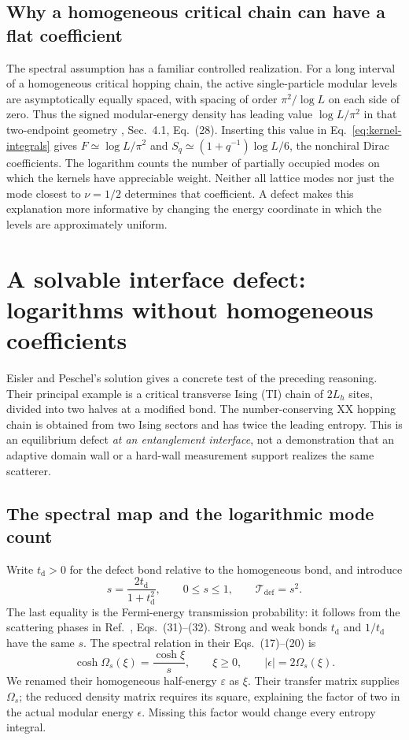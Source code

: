 \documentclass[aps,prb,onecolumn,nofootinbib,superscriptaddress]{revtex4-2}
\begin{document}
\subsection{Why a homogeneous critical chain can have a flat coefficient}
The spectral assumption has a familiar controlled realization. For a
long interval of a homogeneous critical hopping chain, the active
single-particle modular levels are asymptotically equally spaced, with
spacing of order $\pi^2/\log L$ on each side of zero. Thus the signed
modular-energy density has leading value $\log L/\pi^2$ in that
two-endpoint geometry \cite{PeschelEisler2009}, Sec.~4.1, Eq.~(28).
Inserting this value in Eq.~\eqref{eq:kernel-integrals} gives
$F\simeq\log L/\pi^2$ and
$S_q\simeq(1+q^{-1})\log L/6$, the nonchiral Dirac coefficients.
The logarithm counts the number of partially occupied modes on which
the kernels have appreciable weight. Neither all lattice modes nor just
the mode closest to $\nu=1/2$ determines that coefficient. A defect makes
this explanation more informative by changing the energy coordinate in
which the levels are approximately uniform.

\section{A solvable interface defect: logarithms without homogeneous coefficients}
\label{sec:defect}
Eisler and Peschel's solution \cite{EislerPeschel2010} gives a concrete
test of the preceding reasoning. Their principal example is a critical
transverse Ising (TI) chain of $2L_h$ sites, divided into two halves at a
modified bond. The number-conserving XX hopping chain is obtained from
two Ising sectors and has twice the leading entropy. This is an
equilibrium defect \emph{at an entanglement interface}, not a
demonstration that an adaptive domain wall or a hard-wall measurement
support realizes the same scatterer.

\subsection{The spectral map and the logarithmic mode count}
Write $t_{\mathrm d}>0$ for the defect bond relative to the homogeneous
bond, and introduce
\begin{equation}
 s=\frac{2t_{\mathrm d}}{1+t_{\mathrm d}^2},\qquad
 0\leq s\leq1,\qquad \mathcal T_{\mathrm{def}}=s^2.
 \label{eq:defect-transmission}
\end{equation}
The last equality is the Fermi-energy transmission probability:
it follows from the scattering phases in
Ref.~\cite{EislerPeschel2010}, Eqs.~(31)--(32). Strong and weak bonds
$t_{\mathrm d}$ and $1/t_{\mathrm d}$ have the same $s$.
The spectral relation in their Eqs.~(17)--(20) is
\begin{equation}
 \cosh\Omega_s(\xi)=\frac{\cosh\xi}{s},
 \qquad \xi\geq0,\qquad
 |\epsilon|=2\Omega_s(\xi).
 \label{eq:defect-energy-map}
\end{equation}
We renamed their homogeneous half-energy $\varepsilon$ as $\xi$.
Their transfer matrix supplies $\Omega_s$; the reduced density matrix
requires its square, explaining the factor of two in the actual modular
energy $\epsilon$. Missing this factor would change every entropy
integral.
\end{document}
